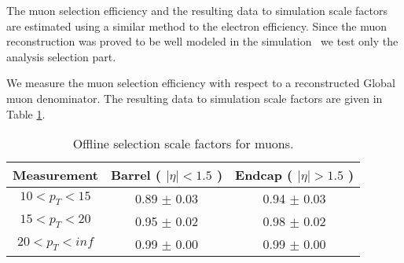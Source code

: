 
The muon selection efficiency and the resulting data to simulation
scale factors are estimated using a similar method to the electron efficiency.
Since the muon reconstruction was proved to be well modeled in the simulation~\cite{VBTFCrossSectionNote}
we test only the analysis selection part.

We measure the muon selection efficiency with respect to a reconstructed Global muon
denominator.
The resulting data to simulation scale factors are given in Table \ref{tab:eff_mu_offline}.

\begin{table}[!ht]
\begin{center}
\begin{tabular}{c|c|c}
\hline
Measurement & Barrel ( $|\eta|<1.5$ )   & Endcap ( $|\eta|>1.5$ )  \\ 
\hline
$  10<p_T<  15$ & 0.89 $\pm$ 0.03  & 0.94 $\pm$ 0.03  \\ \hline 
$  15<p_T<  20$ & 0.95 $\pm$ 0.02  & 0.98 $\pm$ 0.02  \\ \hline 
$  20<p_T<  inf$ & 0.99 $\pm$ 0.00  & 0.99 $\pm$ 0.00  \\ \hline 
\end{tabular}
\caption{Offline selection scale factors for muons.}
\label{tab:eff_mu_offline}
\end{center}
\end{table}


